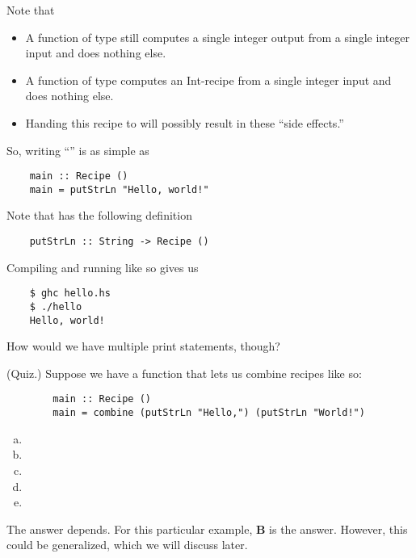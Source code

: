 \documentclass[letterpaper]{article}
\begin{document}
Note that 
\begin{itemize}
    \item A function of type  still computes a single integer output from a single integer input and does nothing else.
    \item A function of type  computes an Int-recipe from a single integer input and does nothing else.
    \item Handing this recipe to  will possibly result in these ``side effects.''
\end{itemize}
So, writing ``'' is as simple as 
\begin{verbatim}
    main :: Recipe ()
    main = putStrLn "Hello, world!"\end{verbatim}
Note that  has the following definition 
\begin{verbatim}
    putStrLn :: String -> Recipe ()\end{verbatim}
Compiling and running like so gives us 
\begin{verbatim}
    $ ghc hello.hs 
    $ ./hello 
    Hello, world!\end{verbatim}
How would we have multiple print statements, though? 
\begin{mdframed}[]
    (Quiz.) Suppose we have a function  that lets us combine recipes like so: 
    \begin{verbatim}
        main :: Recipe ()
        main = combine (putStrLn "Hello,") (putStrLn "World!")\end{verbatim}

    \begin{enumerate}[(a)]
        \item \code{() -> () -> ()}
        \item {}
        \item {}
        \item {}
        \item {}
    \end{enumerate}

    \begin{mdframed}[]
        The answer depends. For this particular example, \textbf{B} is the answer. However, this could be generalized, which we will discuss later. 
    \end{mdframed}
\end{mdframed}
\end{document}
